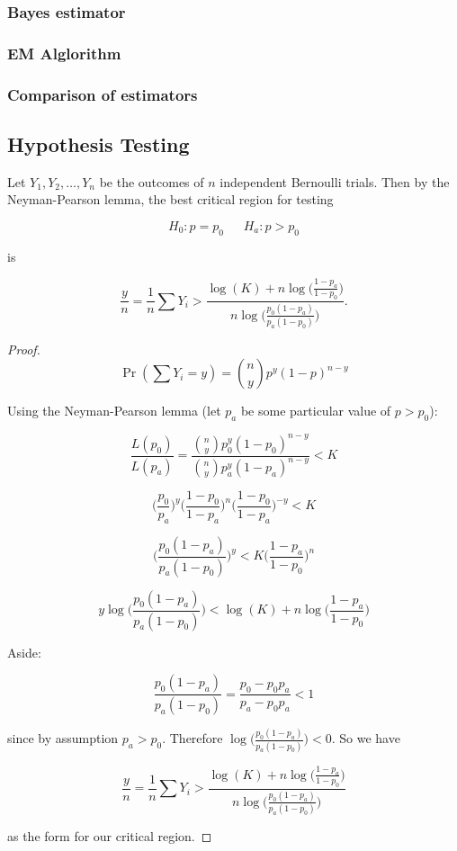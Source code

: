 \subsubsection{Bayes estimator}

\subsubsection{EM Alglorithm}

\subsubsection{Comparison of estimators}

\subsection{Hypothesis Testing}

\begin{proposition} Let \(Y_1, Y_2, \ldots, Y_n\) be the outcomes of \(n\) independent Bernoulli trials. Then by the Neyman-Pearson lemma, the best critical region for testing

\[
H_0: p = p_0 \ \ \ \ \ \ \ H_a: p > p_0
\]

is

\[
\frac{y}{n} = \frac{1}{n}\sum Y_i  > \frac{\log(K) + n \log \bigg( \frac{1 - p_a}{1 - p_0} \bigg)}{n\log \bigg( \frac{p_0(1 - p_a)}{p_a(1 - p_0)} \bigg)}.
\]

\end{proposition}

\begin{proof}

\[
\Pr(\sum Y_i = y) = {n \choose y}p^y(1-p)^{n-y}
\]

Using the Neyman-Pearson lemma (let \(p_a\) be some particular value of \(p > p_0\)):

\[
\frac{L(p_0)}{L(p_a)} = \frac{{n \choose y}p_0^y(1-p_0)^{n-y}}{{n \choose y}p_a^y(1-p_a)^{n-y}} < K
\]

\[
\bigg( \frac{p_0}{p_a} \bigg) ^y   \bigg( \frac{1 - p_0}{1 - p_a} \bigg)^{n} \bigg( \frac{1 - p_0}{1 - p_a} \bigg)^{-y}  < K
\]

\[
\bigg( \frac{p_0(1 - p_a)}{p_a(1 - p_0)} \bigg) ^y  < K  \bigg( \frac{1 - p_a}{1 - p_0} \bigg)^{n} 
\]

\[
y \log \bigg( \frac{p_0(1 - p_a)}{p_a(1 - p_0)} \bigg) < \log(K) + n \log \bigg( \frac{1 - p_a}{1 - p_0} \bigg)
\]

Aside:

\[
\frac{p_0(1 - p_a)}{p_a(1 - p_0)} = \frac{p_0 - p_0 p_a}{p_a - p_0 p_a} < 1
\]

since by assumption \(p_a > p_0\). Therefore \( \log \bigg( \frac{p_0(1 - p_a)}{p_a(1 - p_0)} \bigg) < 0 \). So we have

\[
\frac{y}{n} = \frac{1}{n}\sum Y_i  > \frac{\log(K) + n \log \bigg( \frac{1 - p_a}{1 - p_0} \bigg)}{n\log \bigg( \frac{p_0(1 - p_a)}{p_a(1 - p_0)} \bigg)}
\]

as the form for our critical region.

\end{proof}





%








